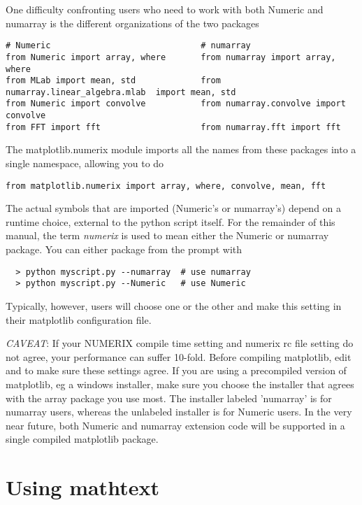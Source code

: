 \documentclass[twoside,10pt]{book}
\begin{document}
One difficulty confronting users who need to work with both Numeric
and numarray is the different organizations of the two packages

\begin{lstlisting}
# Numeric                              # numarray
from Numeric import array, where       from numarray import array, where
from MLab import mean, std             from numarray.linear_algebra.mlab  import mean, std
from Numeric import convolve           from numarray.convolve import convolve
from FFT import fft                    from numarray.fft import fft
\end{lstlisting}

\noindent The matplotlib.numerix module imports all the names from these
packages into a single namespace, allowing you to do

\begin{lstlisting}
from matplotlib.numerix import array, where, convolve, mean, fft
\end{lstlisting}

\noindent The actual symbols that are imported (Numeric's or
numarray's) depend on a runtime choice, external to the python script
itself.  For the remainder of this manual, the term \textit{numerix}
is used to mean either the Numeric or numarray package.  You can
either package from the prompt with
\begin{lstlisting}
  > python myscript.py --numarray  # use numarray
  > python myscript.py --Numeric   # use Numeric
\end{lstlisting}
\noindent Typically, however, users will choose one or the other and
make this setting in their matplotlib configuration file.

\textit{CAVEAT}: If your NUMERIX compile time setting and numerix rc
file setting do not agree, your performance can suffer 10-fold.
Before compiling matplotlib, edit  and
 to make sure these settings agree.  If you are
using a precompiled version of matplotlib, eg a windows installer,
make sure you choose the installer that agrees with the array package
you use most.  The installer labeled 'numarray' is for numarray users,
whereas the unlabeled installer is for Numeric users.  In the very
near future, both Numeric and numarray extension code will be
supported in a single compiled matplotlib package.

\section*{\myheadersize Using mathtext}
\end{document}
